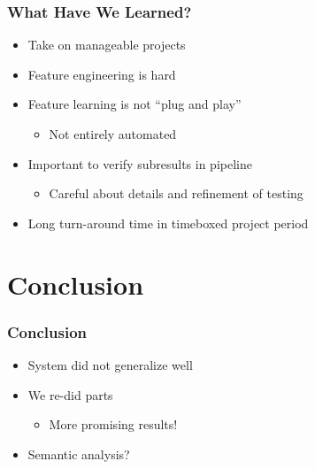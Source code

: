 \begin{frame}
    \frametitle{What Have We Learned?}
    \begin{itemize}
			\item Take on manageable projects
			\item Feature engineering is hard
			\item Feature learning is not ``plug and play''
			\begin{itemize}
				\item Not entirely automated
			\end{itemize}
			\item Important to verify subresults in pipeline
			\begin{itemize}
				\item Careful about details and refinement of testing
			\end{itemize}
			\item Long turn-around time in timeboxed project period
		\end{itemize}
\end{frame}

\section[Conclusion]{Conclusion}

\begin{frame}
    \frametitle{Conclusion}
		\begin{itemize}
			\item System did not generalize well
			\item We re-did parts
			\begin{itemize}
				\item More promising results!
			\end{itemize}
			\item Semantic analysis?
		\end{itemize}
    
\end{frame}
